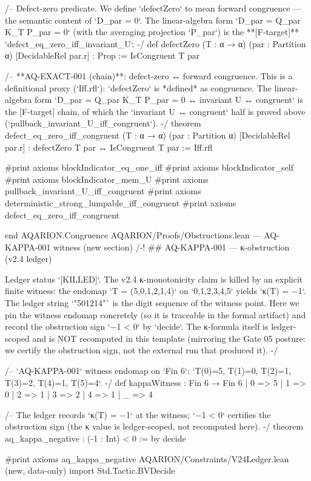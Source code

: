 /-- Defect-zero predicate. We define `defectZero` to mean forward congruence —
    the semantic content of `D_par = 0`. The linear-algebra form
    `D_par = Q_par K_T P_par = 0` (with the averaging projection `P_par`) is the
    **[F-target]** `defect_eq_zero_iff_invariant_U`. -/
def defectZero (T : α → α) (par : Partition α) [DecidableRel par.r] : Prop :=
  IsCongruent T par

/-- **AQ-EXACT-001 (chain)**: defect-zero ↔ forward congruence. This is a
    definitional proxy (`Iff.rfl`): `defectZero` is *defined* as congruence. The
    linear-algebra form `D_par = Q_par K_T P_par = 0 ↔ invariant U ↔ congruent` is the
    [F-target] chain, of which the `invariant U ↔ congruent` half is proved
    above (`pullback_invariant_U_iff_congruent`). -/
theorem defect_eq_zero_iff_congruent (T : α → α) (par : Partition α)
    [DecidableRel par.r] : defectZero T par ↔ IsCongruent T par := Iff.rfl

#print axioms blockIndicator_eq_one_iff
#print axioms blockIndicator_self
#print axioms blockIndicator_mem_U
#print axioms pullback_invariant_U_iff_congruent
#print axioms deterministic_strong_lumpable_iff_congruent
#print axioms defect_eq_zero_iff_congruent

end AQARION.Congruence
AQARION/Proofs/Obstructions.lean — AQ-KAPPA-001 witness (new section)
/-! ## AQ-KAPPA-001 — κ-obstruction (v2.4 ledger)

Ledger status `[KILLED]`. The v2.4 κ-monotonicity claim is killed by an explicit
finite witness: the endomap `T = (5,0,1,2,1,4)` on `{0,1,2,3,4,5}` yields
`κ(T) = −1`. The ledger string `"501214"` is the digit sequence of the witness
point. Here we pin the witness endomap concretely (so it is traceable in the
formal artifact) and record the obstruction sign `−1 < 0` by `decide`.
The κ-formula itself is ledger-scoped and is NOT recomputed in this template
(mirroring the Gate 05 posture: we certify the obstruction sign, not the
external run that produced it). -/

/-- `AQ-KAPPA-001` witness endomap on `Fin 6`: `T(0)=5, T(1)=0, T(2)=1,
    T(3)=2, T(4)=1, T(5)=4`. -/
def kappaWitness : Fin 6 → Fin 6
  | 0 => 5
  | 1 => 0
  | 2 => 1
  | 3 => 2
  | 4 => 1
  | _ => 4

/-- The ledger records `κ(T) = −1` at the witness; `−1 < 0` certifies the
    obstruction sign (the κ value is ledger-scoped, not recomputed here). -/
theorem aq_kappa_negative : (-1 : Int) < 0 := by decide

#print axioms aq_kappa_negative
AQARION/Constraints/V24Ledger.lean (new, data-only)
import Std.Tactic.BVDecide

